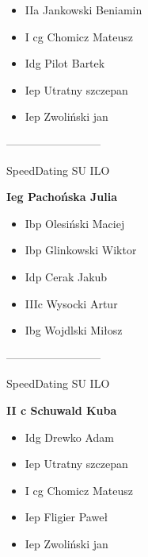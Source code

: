 \documentclass[a4paper,10pt]{article}
\begin{document}
\begin{multicols}{3}
\begin{minipage}[l]{\textwidth}
  \begin{itemize}
    \item IIa Jankowski Beniamin
    \item I cg Chomicz Mateusz
    \item Idg Pilot Bartek
    \item Iep Utratny szczepan
    \item Iep Zwoliński jan

    \end{itemize}



\end{minipage}



\begin{minipage}[l]{\textwidth}
--------------------------

  \footnotesize{SpeedDating SU ILO}

  \bfseries{Ieg Pachońska Julia}

  \begin{itemize}
    \item Ibp Olesiński Maciej
    \item Ibp Glinkowski Wiktor
    \item Idp Cerak Jakub
    \item IIIc Wysocki Artur
    \item Ibg Wojdlski Miłosz

    \end{itemize}



\end{minipage}



\begin{minipage}[l]{\textwidth}
--------------------------

  \footnotesize{SpeedDating SU ILO}

  \bfseries{II c Schuwald Kuba}

  \begin{itemize}
    \item Idg Drewko Adam
    \item Iep Utratny szczepan
    \item I cg Chomicz Mateusz
    \item Iep Fligier Paweł
    \item Iep Zwoliński jan

    \end{itemize}




\end{minipage}
\end{multicols}
\end{document}
